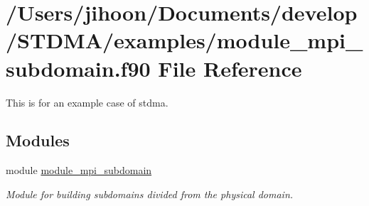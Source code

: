 \hypertarget{module__mpi__subdomain_8f90}{}\section{/\+Users/jihoon/\+Documents/develop/\+S\+T\+D\+M\+A/examples/module\+\_\+mpi\+\_\+subdomain.f90 File Reference}
\label{module__mpi__subdomain_8f90}


This is for an example case of stdma.  


\subsection*{Modules}
\begin{DoxyCompactItemize}
\item 
module \mbox{\hyperlink{namespacemodule__mpi__subdomain}{module\+\_\+mpi\+\_\+subdomain}}
\begin{DoxyCompactList}\small\item\em Module for building subdomains divided from the physical domain. \end{DoxyCompactList}\end{DoxyCompactItemize}
